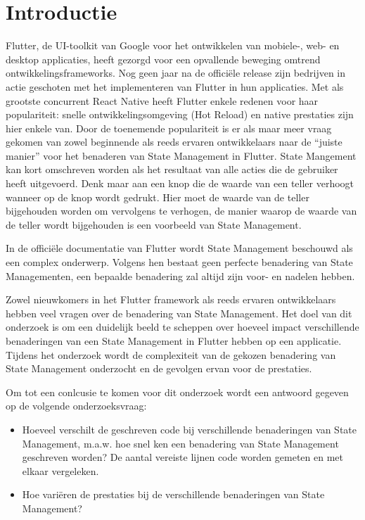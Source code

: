 
\section{Introductie} %
\label{sec:introductie}

Flutter, de UI-toolkit van Google voor het ontwikkelen van mobiele-, web- en desktop applicaties,
heeft gezorgd voor een opvallende beweging omtrend ontwikkelingsframeworks.
Nog geen jaar na de officiële release zijn bedrijven in actie geschoten met het implementeren van Flutter
in hun applicaties.
Met als grootste concurrent React Native heeft Flutter enkele redenen voor haar populariteit: snelle ontwikkelingsomgeving (Hot Reload) en native prestaties zijn hier enkele van.
Door de toenemende populariteit is er als maar meer vraag gekomen van zowel beginnende als
reeds ervaren ontwikkelaars naar de ``juiste manier'' voor het benaderen van State Management in Flutter.
State Mangement kan kort omschreven worden als het resultaat van alle acties die de gebruiker heeft
uitgevoerd.
Denk maar aan een knop die de waarde van een teller verhoogt wanneer op de knop wordt gedrukt. Hier moet de waarde van de teller bijgehouden worden om vervolgens te verhogen, de manier waarop de waarde van de teller wordt bijgehouden is een voorbeeld van State Management.

In de officiële documentatie van Flutter wordt State Management beschouwd als een complex onderwerp. Volgens hen bestaat geen perfecte benadering van State Managementen, een bepaalde benadering zal altijd zijn voor- en nadelen hebben.

Zowel nieuwkomers in het Flutter framework als reeds ervaren ontwikkelaars hebben 
veel vragen over de benadering van State Management.
Het doel van dit onderzoek is om een duidelijk beeld te scheppen over hoeveel impact
verschillende benaderingen van een State Management in Flutter hebben op een applicatie.
Tijdens het onderzoek wordt de complexiteit van de gekozen benadering van State Management  onderzocht en de gevolgen ervan voor de prestaties.

Om tot een conlcusie te komen voor dit onderzoek wordt een antwoord gegeven op de volgende onderzoeksvraag:
\begin{itemize}
    \item Hoeveel verschilt de geschreven code bij verschillende benaderingen van State Management, m.a.w. hoe snel 
    ken een benadering van State Management geschreven worden? De aantal vereiste lijnen code worden gemeten en met elkaar vergeleken.
    \item Hoe variëren de prestaties bij de verschillende benaderingen van State Management?
\end{itemize}
    
